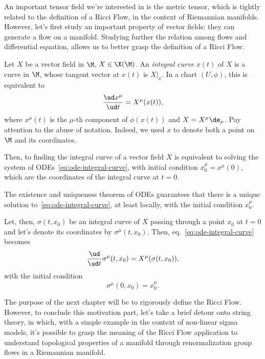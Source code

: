 An important tensor field we're interested in is the metric tensor, which is tightly related to the definition of a Ricci Flow, in the context of Riemannian manifolds. However, let's first study an important property of vector fields: they can generate a flow on a manifold. Studying further the relation among flows and differential equation, allows us to better grasp the definition of a Ricci Flow.







Let $X$ be a vector field in $\M$, $X \in \X(\M)$. An \emph{integral curve} $x(t)$ of $X$ is a curve in $\M$, whose tangent vector at $x(t)$ is $X|_x$. In a chart $(U,\phi)$, this is equivalent to
\begin{equation}\label{eq:ode-integral-curve}
	\frac{\ud x^\mu}{\ud t} = X^\mu(x(t)) ,
\end{equation}
where $x^\mu(t)$ is the $\mu$-th component of $\phi(x(t))$ and $X = X^\mu \de_\mu$. Pay attention to the abuse of notation. Indeed, we used $x$ to denote both a point on $\M$ and its coordinates.

Then, to finding the integral curve of a vector field $X$ is equivalent to solving the system of ODEs~\eqref{eq:ode-integral-curve}, with initial condition $x^\mu_0 = x^\mu (0)$, which are the coordinates of the integral curve at $t=0$.

The existence and uniqueness theorem of ODEs guarantees that there is a unique solution to~\eqref{eq:ode-integral-curve}, at least locally, with the initial condition $x^\mu_0$.

Let, then, $\sigma(t,x_0)$ be an integral curve of $X$ passing through a point $x_0$ at $t=0$ and let's denote its coordinates by $\sigma^\mu(t,x_0)$. Then, eq.~\eqref{eq:ode-integral-curve} becomes
\begin{equation}\label{eq:ode-flow-coordinates}
	\frac{\ud}{\ud t} \sigma^\mu (t,x_0) = X^\mu (\sigma(t,x_0)),
\end{equation}
with the initial condition
\begin{equation}\label{eq:ode-flow-initial-condition}
	\sigma^\mu(0,x_0) = x^\mu_0.
\end{equation}




The purpose of the next chapter will be to rigorously define the Ricci Flow. However, to conclude this motivation part, let's take a brief detour onto string theory, in which, with a simple example in the context of non-linear sigma models, it's possible to grasp the meaning of the Ricci Flow application to understand topological properties of a manifold through renormalization group flows in a Riemannian manifold.

